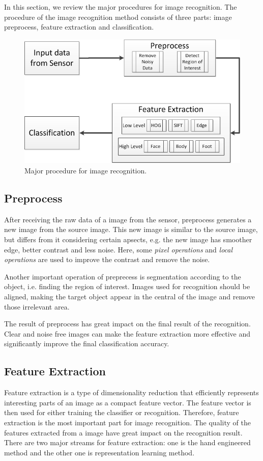 In this section, we review the major procedures for image recognition. 
The procedure of the image recognition method consists of three parts: image preprocess, feature extraction and classification.

\begin{figure}
	\centering
	\includegraphics[scale=.8]{introduction/fig/IRflow.png}
	\caption{Major procedure for image recognition.}\label{fig:intro:irflow}
\end{figure}
\subsection{Preprocess}
After receiving the raw data of a image from the sensor, preprocess generates a new image from the source image. This new image is similar to the source image, but differs from it considering certain apsects, e.g. the new image has smoother edge, better contrast and less noise. 
Here, some \textit{pixel operations} and \textit{local operations} are used to improve the contrast and remove the noise.  

Another important operation of preprecess is segmentation according to the object, i.e. finding the region of interest. Images used for recognition should be aligned, making the target object appear in the central of the image and remove those irrelevant area.

The result of preprocess has great impact on the final result of the recognition. Clear and noise free images can make the feature extraction more effective and significantly improve the final classification accuracy.

\subsection{Feature Extraction}
 Feature extraction is a type of dimensionality reduction that efficiently represents interesting parts of an image as a compact feature vector. The feature vector is then used for either training the classifier or recognition. Therefore, feature extraction is the most important part for image recognition. The quality of the features extracted from a image have great impact on the recognition result. There are two major streams for feature extraction: one is the hand engineered method and the other one is representation learning method.
